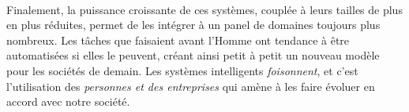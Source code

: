 \paragraph{} Finalement, la puissance croissante de ces systèmes, couplée à leurs tailles de plus en plus réduites, permet de les intégrer à un
panel de domaines toujours plus nombreux. Les tâches que faisaient avant l'Homme ont tendance à être automatisées si elles le peuvent, créant 
ainsi petit à petit un nouveau modèle pour les sociétés de demain. Les systèmes intelligents \emph{foisonnent}, et c'est l'utilisation des \emph{
personnes et des entreprises} qui amène à les faire évoluer en accord avec notre société. 
